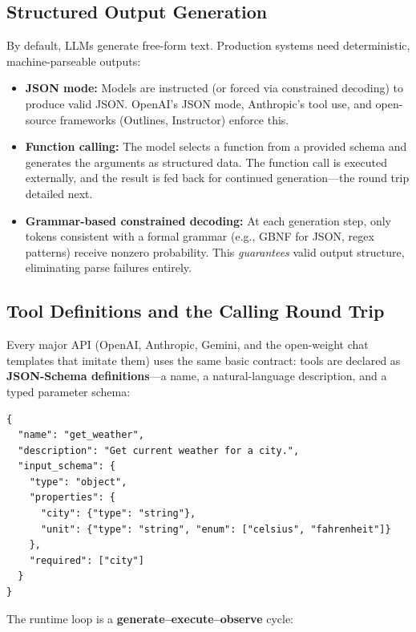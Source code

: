 \subsection{Structured Output Generation}

By default, LLMs generate free-form text.  Production systems need
deterministic, machine-parseable outputs:

\begin{itemize}[leftmargin=*]
\item \textbf{JSON mode:} Models are instructed (or forced via constrained
  decoding) to produce valid JSON.  OpenAI's JSON mode, Anthropic's tool use,
  and open-source frameworks (Outlines, Instructor) enforce this.

\item \textbf{Function calling:} The model selects a function from a provided
  schema and generates the arguments as structured data.  The function call
  is executed externally, and the result is fed back for continued
  generation---the round trip detailed next.

\item \textbf{Grammar-based constrained decoding:} At each generation step,
  only tokens consistent with a formal grammar (e.g., GBNF for JSON, regex
  patterns) receive nonzero probability.  This \emph{guarantees} valid output
  structure, eliminating parse failures entirely.
\end{itemize}

\subsection{Tool Definitions and the Calling Round Trip}

Every major API (OpenAI, Anthropic, Gemini, and the open-weight chat
templates that imitate them) uses the same basic contract: tools are
declared as \textbf{JSON-Schema definitions}---a name, a natural-language
description, and a typed parameter schema:

\begin{lstlisting}
{
  "name": "get_weather",
  "description": "Get current weather for a city.",
  "input_schema": {
    "type": "object",
    "properties": {
      "city": {"type": "string"},
      "unit": {"type": "string", "enum": ["celsius", "fahrenheit"]}
    },
    "required": ["city"]
  }
}
\end{lstlisting}

The runtime loop is a \textbf{generate--execute--observe} cycle:

